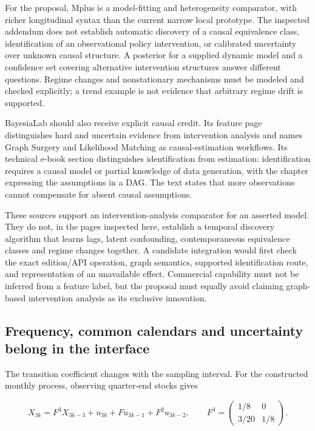 For the proposal, Mplus is a model-fitting and heterogeneity comparator,
with richer longitudinal syntax than the current narrow local prototype.
The inspected addendum does not establish automatic discovery of a
causal equivalence class, identification of an observational policy
intervention, or calibrated uncertainty over unknown causal structure. A
posterior for a supplied dynamic model and a confidence set covering
alternative intervention structures answer different questions. Regime
changes and nonstationary mechanisms must be modeled and checked
explicitly; a trend example is not evidence that arbitrary regime drift
is supported.

BayesiaLab should also receive explicit causal credit. Its feature page
distinguishes hard and uncertain evidence from intervention analysis and
names Graph Surgery and Likelihood Matching as causal-estimation
workflows. Its technical e-book section distinguishes identification
from estimation: identification requires a causal model or partial
knowledge of data generation, with the chapter expressing the
assumptions in a DAG. The text states that more observations cannot
compensate for absent causal
assumptions.~\citep{exec13_ct_bayesia_inference,exec13_ct_bayesia_identification}

These sources support an intervention-analysis comparator for an
asserted model. They do not, in the pages inspected here, establish a
temporal discovery algorithm that learns lags, latent confounding,
contemporaneous equivalence classes and regime changes together. A
candidate integration would first check the exact edition/API operation,
graph semantics, supported identification route, and representation of
an unavailable effect. Commercial capability must not be inferred from a
feature label, but the proposal must equally avoid claiming graph-based
intervention analysis as its exclusive innovation.

\hypertarget{frequency-common-calendars-and-uncertainty-belong-in-the-interface}{%
\subsection{Frequency, common calendars and uncertainty belong in the
interface}\label{frequency-common-calendars-and-uncertainty-belong-in-the-interface}}

The transition coefficient changes with the sampling interval. For the
constructed monthly process, observing quarter-end stocks gives

\[
 X_{3k}=F^3X_{3k-3}+u_{3k}+Fu_{3k-1}+F^2u_{3k-2},\qquad
 F^3=\begin{pmatrix}1/8&0\\3/20&1/8\end{pmatrix}.
\]

